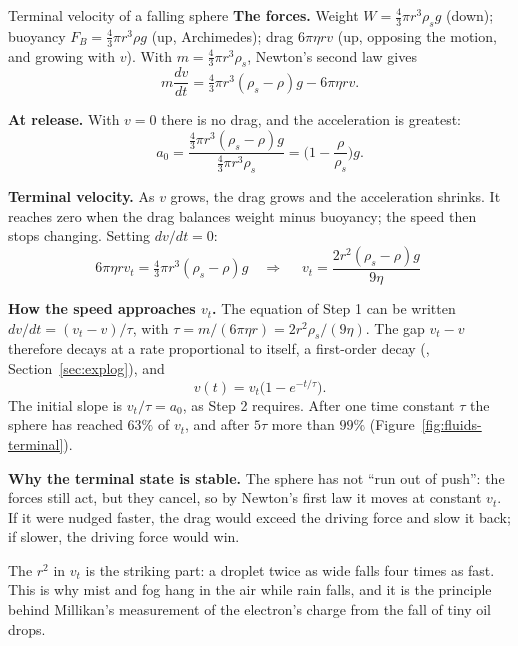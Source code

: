 \begin{derivbox}{Terminal velocity of a falling sphere}
 \textbf{The forces.} Weight $W=\tfrac43\pi r^3\rho_sg$ (down); buoyancy $F_B=\tfrac43\pi r^3\rho g$
(up, Archimedes); drag $6\pi\eta rv$ (up, opposing the motion, and growing with $v$). With
$m=\tfrac43\pi r^3\rho_s$, Newton's second law gives
\[
m\frac{dv}{dt}=\tfrac43\pi r^3(\rho_s-\rho)g-6\pi\eta rv.
\]

 \textbf{At release.} With $v=0$ there is no drag, and the acceleration is greatest:
\[
a_0=\frac{\tfrac43\pi r^3(\rho_s-\rho)g}{\tfrac43\pi r^3\rho_s}=\Big(1-\frac{\rho}{\rho_s}\Big)g.
\]

 \textbf{Terminal velocity.} As $v$ grows, the drag grows and the acceleration shrinks. It reaches
zero when the drag balances weight minus buoyancy; the speed then stops changing. Setting $dv/dt=0$:
\[
6\pi\eta rv_t=\tfrac43\pi r^3(\rho_s-\rho)g\quad\Longrightarrow\quad
\boxed{\;v_t=\frac{2r^2(\rho_s-\rho)g}{9\eta}\;}
\]

 \textbf{How the speed approaches $v_t$.} The equation of Step 1 can be written
$dv/dt=(v_t-v)/\tau$, with $\tau=m/(6\pi\eta r)=2r^2\rho_s/(9\eta)$. The gap $v_t-v$ therefore decays at
a rate proportional to itself, a first-order decay (, Section~\ref{sec:explog}), and
\[
v(t)=v_t\big(1-e^{-t/\tau}\big).
\]
The initial slope is $v_t/\tau=a_0$, as Step 2 requires. After one time constant $\tau$ the sphere has
reached $63\%$ of $v_t$, and after $5\tau$ more than $99\%$ (Figure~\ref{fig:fluids-terminal}).

 \textbf{Why the terminal state is stable.} The sphere has not ``run out of push'': the forces still
act, but they cancel, so by Newton's first law it moves at constant $v_t$. If it were nudged faster, the
drag would exceed the driving force and slow it back; if slower, the driving force would win.
\end{derivbox}

\begin{figure}[htbp]
\centering
{}
\end{figure}

The $r^2$ in $v_t$ is the striking part: a droplet twice as wide falls four times as fast. This is why
mist and fog hang in the air while rain falls, and it is the principle behind Millikan's measurement of the
electron's charge from the fall of tiny oil drops.


